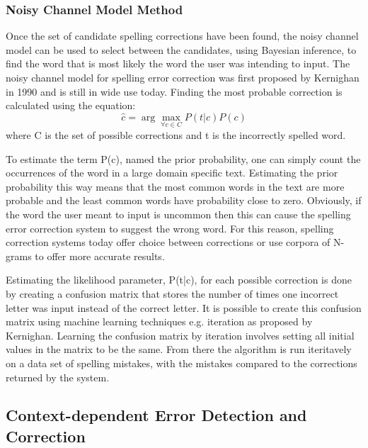 \subsubsection{Noisy Channel Model Method}

Once the set of candidate spelling corrections have been found, the noisy channel model can be used to select between the candidates, using Bayesian inference, to find the word that is most likely the word the user was intending to input. The noisy channel model for spelling error correction was first proposed by Kernighan in 1990 \cite{Kernighan1990} and is still in wide use today. Finding the most probable correction is calculated using the equation:
\[
\hat{c} = \arg\max_{\forall c \in C} P(t|c) P(c)
\]
where C is the set of possible corrections and t is the incorrectly spelled word.

To estimate the term P(c), named the prior probability, one can simply count the occurrences of the word in a large domain specific text. Estimating the prior probability this way means that the most common words in the text are more probable and the least common words have probability close to zero. Obviously, if the word the user meant to input is uncommon then this can cause the spelling error correction system to suggest the wrong word. For this reason, spelling correction systems today offer choice between corrections or use corpora of N-grams to offer more accurate results.

Estimating the likelihood parameter, P(t|c), for each possible correction is done by creating a confusion matrix that stores the number of times one incorrect letter was input instead of the correct letter. It is possible to create this confusion matrix using machine learning techniques e.g. iteration as proposed by Kernighan.\cite{Kernighan1990} Learning the confusion matrix by iteration involves setting all initial values in the matrix to be the same. From there the algorithm is run iteritavely on a data set of spelling mistakes, with the mistakes compared to the corrections returned by the system.

\subsection{Context-dependent Error Detection and Correction}

